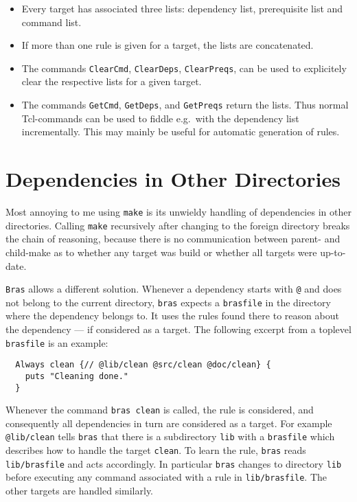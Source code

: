 \documentclass[12pt]{article}
\newcommand{\bras}{\texttt{bras}}
\newcommand{\Bras}{\texttt{Bras}}
\newcommand{\make}{\texttt{make}}
\begin{document}
\begin{itemize}
\item
Every target has associated three lists: dependency list, prerequisite
list and command list.
\item
If more than one rule is given for a target, the lists are
concatenated. 
\item
The commands \texttt{ClearCmd}, \texttt{ClearDeps},
\texttt{ClearPreqs}, can be used to explicitely clear the respective
lists for a given target.
\item
The commands \texttt{GetCmd}, \texttt{GetDeps}, and
\texttt{GetPreqs} return the lists. Thus normal Tcl-commands can be
used to fiddle e.g.\ with the dependency list incrementally. This may
mainly be useful for automatic generation of rules.
\end{itemize}


\section{Dependencies in Other Directories}

Most annoying to me using \make{} is its unwieldy handling of
dependencies in other directories. Calling \make{}
recursively after changing to the foreign directory
breaks the chain of reasoning, because there is no communication
between parent- and child-make as to whether any target was build or
whether all targets were up-to-date.

\Bras{} allows a different solution. Whenever a dependency starts with
\texttt{@} and does not belong to the current directory, \bras{} expects
a \texttt{brasfile} in the directory where the dependency belongs
to. It uses the rules found there to reason about the dependency ---
if considered as a target.  The following excerpt from a
toplevel \texttt{brasfile} is an example:

\begin{verbatim}
  Always clean {// @lib/clean @src/clean @doc/clean} {
    puts "Cleaning done."
  }
\end{verbatim}

Whenever the command \texttt{bras clean}
is called, the rule is considered, and consequently all
dependencies in turn are considered as a target. For example
\texttt{@lib/clean} tells \bras{} that there is a subdirectory
\texttt{lib} with a \texttt{brasfile} which
describes how to handle the target \texttt{clean}. To learn
the rule, \bras{} reads \texttt{lib/brasfile} and acts accordingly.
In particular \bras{} changes to directory \texttt{lib}
before executing any command associated with a rule in
\texttt{lib/brasfile}. The other targets are handled similarly.
\end{document}
